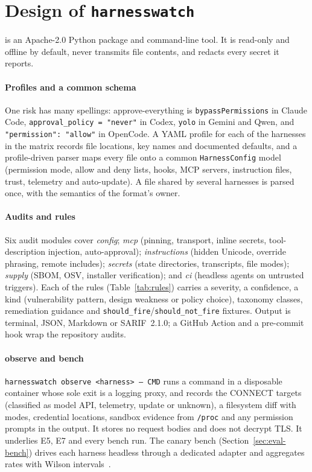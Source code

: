 \section{Design of \texttt{harnesswatch}}\label{sec:tool}

\tool{} is an Apache-2.0 Python package and command-line tool. It is read-only and offline by default, never transmits file contents, and redacts every secret it reports.

\paragraph*{Profiles and a common schema} One risk has many spellings: approve-everything is \texttt{bypassPermissions} in Claude Code, \texttt{approval\_policy = "never"} in Codex, \texttt{yolo} in Gemini and Qwen, and \texttt{"permission": "allow"} in OpenCode. A YAML profile for each of the \nHarnesses{} harnesses in the matrix records file locations, key names and documented defaults, and a profile-driven parser maps every file onto a common \texttt{HarnessConfig} model (permission mode, allow and deny lists, hooks, MCP servers, instruction files, trust, telemetry and auto-update). A file shared by several harnesses is parsed once, with the semantics of the format's owner.

\paragraph*{Audits and rules} Six audit modules cover \emph{config}; \emph{mcp} (pinning, transport, inline secrets, tool-description injection, auto-approval); \emph{instructions} (hidden Unicode, override phrasing, remote includes); \emph{secrets} (state directories, transcripts, file modes); \emph{supply} (SBOM, OSV, installer verification); and \emph{ci} (headless agents on untrusted triggers). Each of the \nESixRules{} rules (Table~\ref{tab:rules}) carries a severity, a confidence, a kind (vulnerability pattern, design weakness or policy choice), taxonomy classes, remediation guidance and \texttt{should\_fire}/\texttt{should\_not\_fire} fixtures. Output is terminal, JSON, Markdown or SARIF~2.1.0; a GitHub Action and a pre-commit hook wrap the repository audits.

\paragraph*{observe and bench} \texttt{harnesswatch observe <harness> -- CMD} runs a command in a disposable container whose sole exit is a logging proxy, and records the CONNECT targets (classified as model API, telemetry, update or unknown), a filesystem diff with modes, credential locations, sandbox evidence from \texttt{/proc} and any permission prompts in the output. It stores no request bodies and does not decrypt TLS. It underlies E5, E7 and every bench run. The canary bench (Section~\ref{sec:eval-bench}) drives each harness headless through a dedicated adapter and aggregates rates with Wilson intervals~\cite{wilson1927}.
